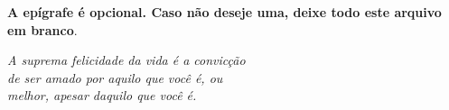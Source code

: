 \begin{epigrafe}
    \vspace*{\fill}
	\begin{flushright}
		\textbf{A epígrafe é opcional. Caso não deseje uma, deixe todo
		este arquivo em branco}.

		\textit{A suprema felicidade da vida é a convicção\\
			de ser amado por aquilo que você é, ou\\
			melhor, apesar daquilo que você é.\\
			[Os Miseráveis – Victor Hugo, 1862]}
	\end{flushright}
\end{epigrafe}
